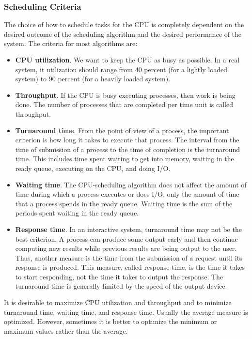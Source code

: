 \subsubsection{Scheduling Criteria}\label{subsubsec:Scheduling_Criteria}
The choice of how to schedule tasks for the CPU is completely dependent on the desired outcome of the scheduling algorithm and the desired performance of the system.
The criteria for most algorithms are:
\begin{itemize}[noitemsep]
\item \textbf{CPU utilization}.
  We want to keep the CPU as busy as possible.
  In a real system, it utilization should range from 40 percent (for a lightly loaded system) to 90 percent (for a heavily loaded system).
\item \textbf{Throughput}.
  If the CPU is busy executing processes, then work is being done.
  The number of processes that are completed per time unit is called throughput.
\item \textbf{Turnaround time}.
  From the point of view of a process, the important criterion is how long it takes to execute that process.
  The interval from the time of submission of a process to the time of completion is the turnaround time.
  This includes time spent waiting to get into memory, waiting in the ready queue, executing on the CPU, and doing I/O.
\item \textbf{Waiting time}.
  The CPU-scheduling algorithm does not affect the amount of time during which a process executes or does I/O, only the amount of time that a process spends in the ready queue.
  Waiting time is the sum of the periods spent waiting in the ready queue.
\item \textbf{Response time}.
  In an interactive system, turnaround time may not be the best criterion.
  A process can produce some output early and then continue computing new results while previous results are being output to the user.
  Thus, another measure is the time from the submission of a request until its response is produced.
  This measure, called response time, is the time it takes to start responding, not the time it takes to output the response.
  The turnaround time is generally limited by the speed of the output device.
\end{itemize}

It is desirable to maximize CPU utilization and throughput and to minimize turnaround time, waiting time, and response time.
Usually the average measure is optimized.
However, sometimes it is better to optimize the minimum or maximum values rather than the average.

